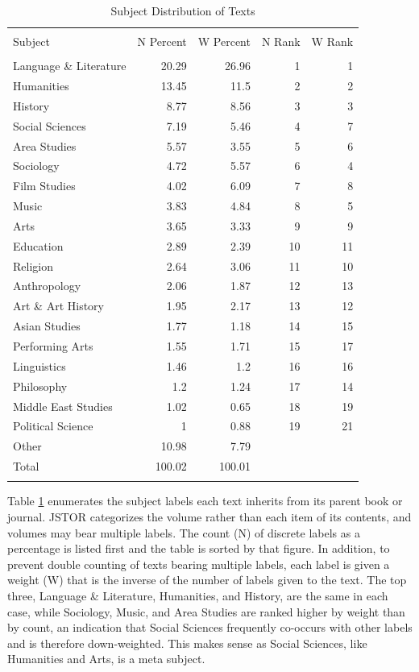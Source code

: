 \documentclass[]{book}
\theoremstyle{definition}
\theoremstyle{definition}
\theoremstyle{definition}
\theoremstyle{remark}
\begin{document}
\begin{table}[!htbp] \centering 
  \caption{Subject Distribution of Texts} 
  \label{tab:genre-jsubj} 
\begin{tabular}{@{\extracolsep{5pt}} lrrrr} 
\\[-1.8ex]\hline 
\hline \\[-1.8ex] 
Subject & N Percent & W Percent & N Rank & W Rank \\ 
\hline \\[-1.8ex] 
Language \& Literature & 20.29 & 26.96 & 1 & 1 \\ 
Humanities & 13.45 & 11.5 & 2 & 2 \\ 
History & 8.77 & 8.56 & 3 & 3 \\ 
Social Sciences & 7.19 & 5.46 & 4 & 7 \\ 
Area Studies & 5.57 & 3.55 & 5 & 6 \\ 
Sociology & 4.72 & 5.57 & 6 & 4 \\ 
Film Studies & 4.02 & 6.09 & 7 & 8 \\ 
Music & 3.83 & 4.84 & 8 & 5 \\ 
Arts & 3.65 & 3.33 & 9 & 9 \\ 
Education & 2.89 & 2.39 & 10 & 11 \\ 
Religion & 2.64 & 3.06 & 11 & 10 \\ 
Anthropology & 2.06 & 1.87 & 12 & 13 \\ 
Art \& Art History & 1.95 & 2.17 & 13 & 12 \\ 
Asian Studies & 1.77 & 1.18 & 14 & 15 \\ 
Performing Arts & 1.55 & 1.71 & 15 & 17 \\ 
Linguistics & 1.46 & 1.2 & 16 & 16 \\ 
Philosophy & 1.2 & 1.24 & 17 & 14 \\ 
Middle East Studies & 1.02 & 0.65 & 18 & 19 \\ 
Political Science & 1 & 0.88 & 19 & 21 \\ 
Other & 10.98 & 7.79 &  &  \\ 
Total & 100.02 & 100.01 &  &  \\ 
\hline \\[-1.8ex] 
\end{tabular} 
\end{table}

Table \ref{tab:genre-jsubj} enumerates the subject labels each text
inherits from its parent book or journal. JSTOR categorizes the volume
rather than each item of its contents, and volumes may bear multiple
labels. The count (N) of discrete labels as a percentage is listed first
and the table is sorted by that figure. In addition, to prevent double
counting of texts bearing multiple labels, each label is given a weight
(W) that is the inverse of the number of labels given to the text. The
top three, Language \& Literature, Humanities, and History, are the same
in each case, while Sociology, Music, and Area Studies are ranked higher
by weight than by count, an indication that Social Sciences frequently
co-occurs with other labels and is therefore down-weighted. This makes
sense as Social Sciences, like Humanities and Arts, is a meta subject.
\end{document}
